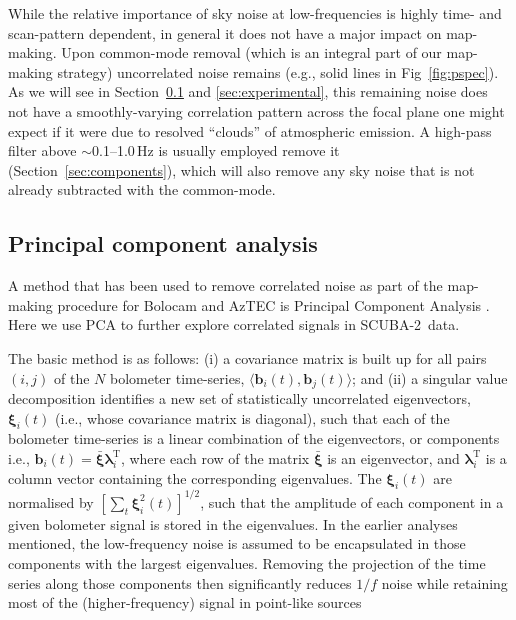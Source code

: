 \documentclass[useAMS,usenatbib,nofootinbib]{mn2e}
\newcommand{\scuba}{SCUBA-2}
\begin{document}
While the relative importance of sky noise at low-frequencies is
highly time- and scan-pattern dependent, in general it does not have a
major impact on map-making. Upon common-mode removal (which is an
integral part of our map-making strategy) uncorrelated noise remains
(e.g., solid lines in Fig~\ref{fig:pspec}). As we will see in
Section~\ref{sec:pca} and \ref{sec:experimental}, this remaining noise
does not have a smoothly-varying correlation pattern across the focal
plane one might expect if it were due to resolved ``clouds'' of
atmospheric emission. A high-pass filter above $\sim$0.1--1.0\,Hz is
usually employed remove it (Section~\ref{sec:components}), which will
also remove any sky noise that is not already subtracted with the
common-mode.

\subsection{Principal component analysis}
\label{sec:pca}

A method that has been used to remove correlated noise as part of the
map-making procedure for Bolocam and AzTEC is Principal Component
Analysis \citep[PCA,][]{laurent2005,scott2008,perera2008}. Here we use
PCA to further explore correlated signals in \scuba\ data.

The basic method is as follows: (i) a covariance matrix is built up
for all pairs $(i,j)$ of the $N$ bolometer time-series,
$\langle\mathbf{b}_i(t),\mathbf{b}_j(t)\rangle$; and (ii) a singular
value decomposition identifies a new set of statistically uncorrelated
eigenvectors, $\mathbf{\xi}_i(t)$ (i.e., whose covariance matrix is
diagonal), such that each of the bolometer time-series is a linear
combination of the eigenvectors, or components i.e., $\mathbf{b}_i(t)
= \bar{\mathbf{\xi}} \mathbf{\lambda}_i^\mathrm{T}$, where each row of
the matrix $\bar{\mathbf{\xi}}$ is an eigenvector, and
$\mathbf{\lambda}_i^\mathrm{T}$ is a column vector containing the
corresponding eigenvalues. The $\mathbf{\xi}_i(t)$ are normalised by
$[\sum_t \mathbf{\xi}_i^2(t)]^{1/2}$, such that the amplitude of each
component in a given bolometer signal is stored in the eigenvalues. In
the earlier analyses mentioned, the low-frequency noise is assumed to
be encapsulated in those components with the largest
eigenvalues. Removing the projection of the time series along those
components then significantly reduces $1/f$ noise while retaining most
of the (higher-frequency) signal in point-like sources
\end{document}
